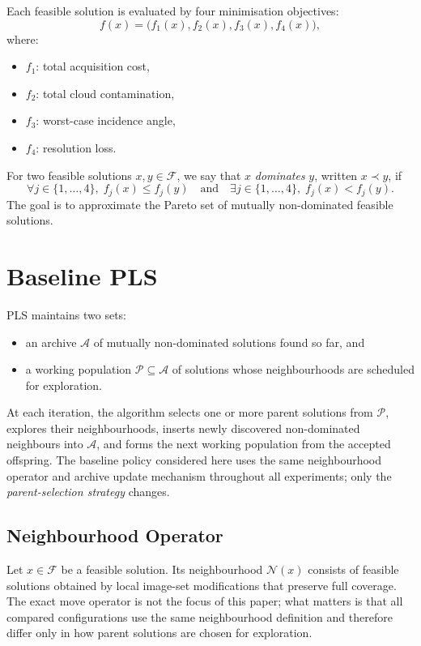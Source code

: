 \documentclass[11pt,a4paper]{article}
\newcommand{\calA}{\ensuremath{\mathcal{A}}}
\newcommand{\calF}{\ensuremath{\mathcal{F}}}
\newcommand{\calN}{\ensuremath{\mathcal{N}}}
\newcommand{\calP}{\ensuremath{\mathcal{P}}}
\begin{document}
Each feasible solution is evaluated by four minimisation objectives:
\[
f(x) = \bigl(f_1(x), f_2(x), f_3(x), f_4(x)\bigr),
\]
where:
\begin{itemize}
  \item \(f_1\): total acquisition cost,
  \item \(f_2\): total cloud contamination,
  \item \(f_3\): worst-case incidence angle,
  \item \(f_4\): resolution loss.
\end{itemize}

For two feasible solutions \(x,y \in \calF\), we say that \(x\)
\emph{dominates} \(y\), written \(x \prec y\), if
\[
\forall j \in \{1,\dots,4\},\; f_j(x) \le f_j(y)
\quad\text{and}\quad
\exists j \in \{1,\dots,4\},\; f_j(x) < f_j(y).
\]
The goal is to approximate the Pareto set of mutually non-dominated
feasible solutions.

\section{Baseline PLS}\label{sec:baseline}

PLS maintains two sets:
\begin{itemize}
  \item an archive \(\calA\) of mutually non-dominated solutions found
    so far, and
  \item a working population \(\calP \subseteq \calA\) of solutions
    whose neighbourhoods are scheduled for exploration.
\end{itemize}

At each iteration, the algorithm selects one or more parent solutions
from \(\calP\), explores their neighbourhoods, inserts newly discovered
non-dominated neighbours into \(\calA\), and forms the next working
population from the accepted offspring.  The baseline policy considered
here uses the same neighbourhood operator and archive update mechanism
throughout all experiments; only the \emph{parent-selection strategy}
changes.

\subsection{Neighbourhood Operator}

Let \(x \in \calF\) be a feasible solution.  Its neighbourhood
\(\calN(x)\) consists of feasible solutions obtained by local image-set
modifications that preserve full coverage.  The exact move operator is
not the focus of this paper; what matters is that all compared
configurations use the same neighbourhood definition and therefore
differ only in how parent solutions are chosen for exploration.
\end{document}
